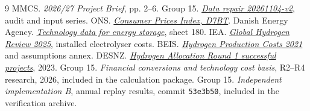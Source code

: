 \begin{thebibliography}{9}
\footnotesize\setlength{\itemsep}{0pt}\setlength{\parskip}{0pt}
 MMCS. \emph{2026/27 Project Brief}, pp. 2--6.
 Group 15. \href{https://github.com/MocryMin/mmcs-group15-project/tree/53e3b50/Tier1/public/data_quality/full_data_repair/20261104-v2}{\emph{Data repair 20261104-v2}}, audit and input series.
 ONS. \href{https://www.ons.gov.uk/economy/inflationandpriceindices/timeseries/d7bt/mm23}{\emph{Consumer Prices Index, D7BT}}.
 Danish Energy Agency. \href{https://ens.dk/media/6589/download}{\emph{Technology data for energy storage}}, sheet 180.
 IEA. \href{https://www.iea.org/reports/global-hydrogen-review-2025/executive-summary}{\emph{Global Hydrogen Review 2025}}, installed electrolyser costs.
 BEIS. \href{https://assets.publishing.service.gov.uk/media/611b710e8fa8f53dc994e59d/Hydrogen_Production_Costs_2021.pdf}{\emph{Hydrogen Production Costs 2021}} and assumptions annex.
 DESNZ. \href{https://www.gov.uk/government/publications/hydrogen-production-business-model-net-zero-hydrogen-fund-shortlisted-projects/hydrogen-production-business-model-net-zero-hydrogen-fund-har1-successful-projects}{\emph{Hydrogen Allocation Round 1 successful projects}}, 2023.
 Group 15. \emph{Financial conversions and technology cost basis},
R2--R4 research, 2026, included in the calculation package.
 Group 15. \emph{Independent implementation B}, annual replay results,
commit \texttt{53e3b50}, included in the verification archive.
\end{thebibliography}
